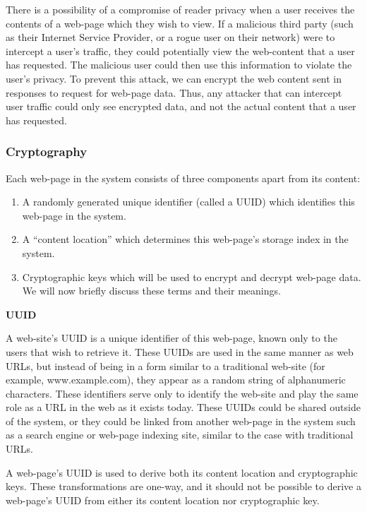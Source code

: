 There is a possibility of a compromise of reader privacy when a user receives the contents of a web-page which
they wish to view. If a malicious third party (such as their Internet Service Provider, or a rogue user on their
network) were to intercept a user's traffic, they could potentially view the web-content that a user has requested.
The malicious user could then use this information to violate the user's privacy.
To prevent this attack, we can encrypt the web content sent in responses to request for web-page data. Thus, any
attacker that can intercept user traffic could only see encrypted data, and not the actual content that a user has
requested.

\subsubsection{Cryptography}

Each web-page in the system consists of three components apart from its content:
\begin{enumerate}
    \item A randomly generated unique identifier (called a UUID) which identifies this web-page in the system.
    \item A ``content location'' which determines this web-page's storage index in the system.
    \item Cryptographic keys which will be used to encrypt and decrypt web-page data.
We will now briefly discuss these terms and their meanings.
\end{enumerate}

\textbf{UUID}

A web-site's UUID is a unique identifier of this web-page, known only to the users that wish to retrieve it.
These UUIDs are used in the same manner as web URLs, but instead of being in a form similar to a traditional web-site
(for example, www.example.com), they appear as a random string of alphanumeric characters. These identifiers serve
only to identify the web-site and play the same role as a URL in the web as it exists today. These UUIDs could be
shared outside of the system, or they could be linked from another web-page in the system such as a search engine or
web-page indexing site, similar to the case with traditional URLs.

A web-page's UUID is used to derive both its content location and cryptographic keys. These transformations are one-way,
and it should not be possible to derive a web-page's UUID from either its content location nor cryptographic key.

